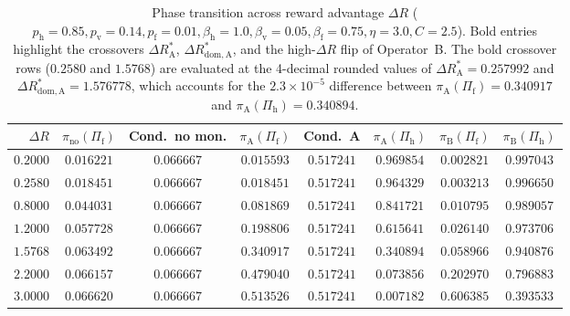 \documentclass[11pt,a4paper]{article}
\begin{document}
\begin{table}[ht]
\centering
\caption{Phase transition across reward advantage $\Delta R$ ($p_{\mathrm{h}}=0.85, p_{\mathrm{v}}=0.14, p_{\mathrm{f}}=0.01, \beta_{\mathrm{h}}=1.0, \beta_{\mathrm{v}}=0.05, \beta_{\mathrm{f}}=0.75, \eta=3.0, C=2.5$). Bold entries highlight the crossovers $\Delta R_{\mathrm{A}}^*$, $\Delta R_{\mathrm{dom, A}}^*$, and the high-$\Delta R$ flip of Operator~B. The bold crossover rows ($0.2580$ and $1.5768$) are evaluated at the 4-decimal rounded values of $\Delta R_{\mathrm{A}}^* = 0.257992$ and $\Delta R_{\mathrm{dom, A}}^* = 1.576778$, which accounts for the $2.3 \times 10^{-5}$ difference between $\pi_{\mathrm{A}}(\Pi_{\mathrm{f}}) = 0.340917$ and $\pi_{\mathrm{A}}(\Pi_{\mathrm{h}}) = 0.340894$.}
\label{tab:deltaR}
\small
\setlength{\tabcolsep}{4pt}
\begin{tabular}{@{}rccccccc@{}}
\toprule
$\Delta R$ & $\pi_{\mathrm{no}}(\Pi_{\mathrm{f}})$ & Cond.\ no mon. & $\pi_{\mathrm{A}}(\Pi_{\mathrm{f}})$ & Cond.\ A & $\pi_{\mathrm{A}}(\Pi_{\mathrm{h}})$ & $\pi_{\mathrm{B}}(\Pi_{\mathrm{f}})$ & $\pi_{\mathrm{B}}(\Pi_{\mathrm{h}})$ \\
\midrule
$0.2000$ & $0.016221$ & $0.066667$ & $0.015593$ & $0.517241$ & $0.969854$ & $0.002821$ & $0.997043$ \\
$\mathbf{0.2580}$ & $\mathbf{0.018451}$ & $0.066667$ & $\mathbf{0.018451}$ & $0.517241$ & $0.964329$ & $0.003213$ & $0.996650$ \\
$0.8000$ & $0.044031$ & $0.066667$ & $0.081869$ & $0.517241$ & $0.841721$ & $0.010795$ & $0.989057$ \\
$1.2000$ & $0.057728$ & $0.066667$ & $0.198806$ & $0.517241$ & $0.615641$ & $0.026140$ & $0.973706$ \\
$\mathbf{1.5768}$ & $0.063492$ & $0.066667$ & $\mathbf{0.340917}$ & $0.517241$ & $\mathbf{0.340894}$ & $0.058966$ & $0.940876$ \\
$2.2000$ & $0.066157$ & $0.066667$ & $0.479040$ & $0.517241$ & $0.073856$ & $0.202970$ & $0.796883$ \\
$3.0000$ & $0.066620$ & $0.066667$ & $0.513526$ & $0.517241$ & $0.007182$ & $\mathbf{0.606385}$ & $0.393533$ \\
\bottomrule
\end{tabular}
\end{table}
\end{document}
